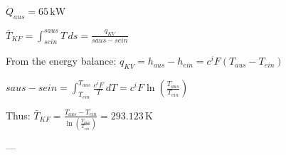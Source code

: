\( \dot{Q}_{aus} = 65 \, \text{kW} \)  

\( \bar{T}_{KF} = \int_{sein}^{saus} T \, ds = \frac{q_{KV}}{saus - sein} \)  

From the energy balance:  
\( q_{KV} = h_{aus} - h_{ein} = c^i F (T_{aus} - T_{ein}) \)  

\( saus - sein = \int_{T_{ein}}^{T_{aus}} \frac{c^i F}{T} \, dT = c^i F \ln \left( \frac{T_{aus}}{T_{ein}} \right) \)  

Thus:  
\( \bar{T}_{KF} = \frac{T_{aus} - T_{ein}}{\ln \left( \frac{T_{aus}}{T_{ein}} \right)} = 293.123 \, \text{K} \)  

---